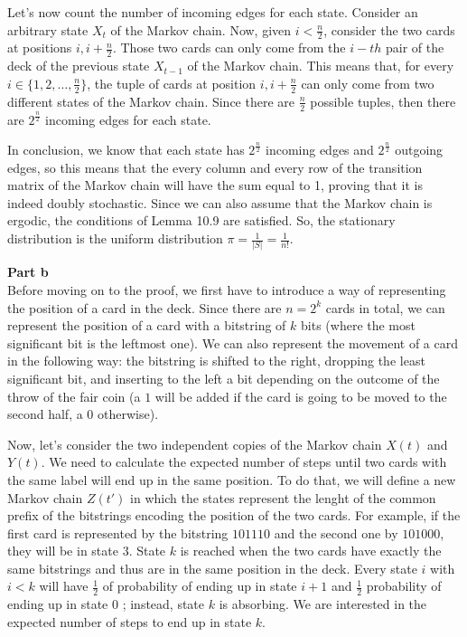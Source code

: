 \documentclass[a4paper,german]{article}
\begin{document}
Let's now count the number of incoming edges for each state. Consider an
arbitrary state $X_t$ of the Markov chain. Now, given $i < \frac{n}{2}$,
consider the two cards at positions $i, i + \frac{n}{2}$. Those two cards can
only come from the $i-th$ pair of the deck of the previous state $X_{t-1}$ of
the Markov chain.
This means that, for every $i \in \{ 1, 2, \dots, \frac{n}{2}\}$, the tuple of cards at position $i, i + \frac{n}{2}$ can only come from two different states of the Markov chain. Since there are $\frac{n}{2}$ possible tuples, then there are $2^\frac{n}{2}$ incoming edges for each state.

In conclusion, we know that each state has $2^\frac{n}{2}$ incoming edges and
$2^\frac{n}{2}$ outgoing edges, so this means that the every column and every
row of the transition matrix of the Markov chain will have the sum equal to 1,
proving that it is indeed doubly stochastic. Since we can also assume that the
Markov chain is ergodic, the conditions of Lemma 10.9 are satisfied. So, the
stationary distribution is the uniform distribution $\pi =
\frac{1}{|S|} = \frac{1}{n!}$.


\vspace{1em}
\noindent 
\textbf{Part b} \\



Before moving on to the proof, we first have to introduce a way of representing the position of a card in the deck.
Since there are $n = 2^k$ cards in total, we can represent the position of a card with a bitstring of $k$ bits (where the most significant bit is the leftmost one).
We can also represent the movement of a card in the following way: the bitstring is shifted to the right, dropping the least significant bit, and inserting to the left a bit depending on the outcome of the throw of the fair coin (a $1$ will be added if the card is going to be moved to the second half, a $0$ otherwise).

Now, let's consider the two independent copies of the Markov chain $X(t)$ and $Y(t)$. We need to calculate the expected number of steps until two cards with the same label will end up in the same position. 
To do that, we will define a new Markov chain $Z(t')$ in which the states represent the lenght of the common prefix
of the bitstrings encoding the position of the two cards. For example, if the first card is represented
by the bitstring $101110$ and the second one by $101000$, they will be in state $3$. State $k$ is reached when the two cards have exactly the same bitstrings and thus are in the same position in the deck. Every state $i$ with $i < k$ will have $\frac{1}{2}$ of probability of ending up in state $i+1$ and $\frac{1}{2}$ probability of ending up in state $0$ ; instead, state $k$ is absorbing. We are interested in the expected number of steps to end up in state $k$.
\end{document}
